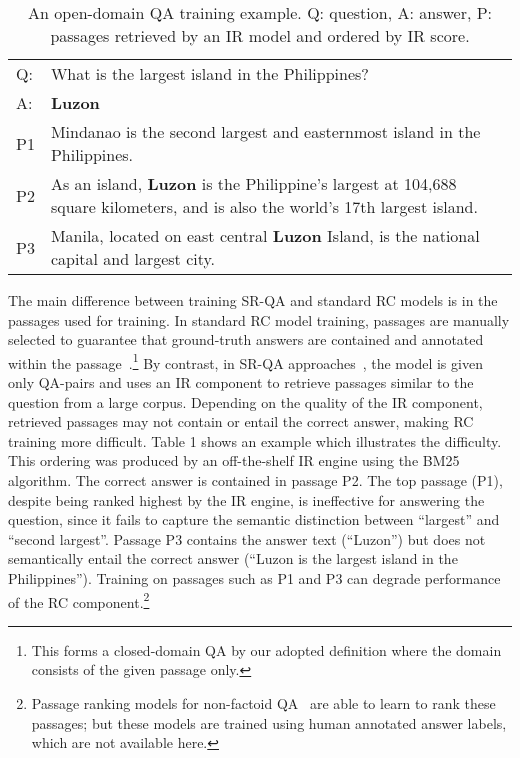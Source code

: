 \documentclass[letterpaper]{article} %
\begin{document}
\begin{table}[]
\centering
\small
\begin{tabular}{ll}
Q: & \multicolumn{1}{p{7cm}}{What is the largest island in the Philippines?}                                                      \\
A: & \multicolumn{1}{p{7cm}}{\textbf{Luzon}}\\
P1 & \multicolumn{1}{p{7cm}}{Mindanao is the second largest and easternmost island in the Philippines.}                               \\
P2 & \multicolumn{1}{p{7cm}}{As an island, \textbf{Luzon} is the Philippine's largest at 104,688 square kilometers, and is also the world's 17th largest island.}                                       \\
P3 & \multicolumn{1}{p{7cm}}{Manila, located on east central \textbf{Luzon} Island, is the national capital and largest city. }                                       \\
\end{tabular}
\normalsize
\caption{An open-domain QA training example. Q: question, A: answer, P: passages retrieved by an IR model and ordered by IR score. }
\label{example}
\end{table}
The main difference between training SR-QA and standard RC models is in the passages used for training. In standard RC model training, passages are manually selected to guarantee that ground-truth answers are contained and annotated within the passage~\cite{rajpurkar2016squad}.\footnote{This forms a closed-domain QA by our adopted definition where the domain consists of the given passage only.}
By contrast, in SR-QA approaches~\cite{chen2017reading,dhingra2017quasar}, the model is given only QA-pairs and uses an IR component to retrieve passages similar to the question from a large corpus. 
Depending on the quality of the IR component, retrieved passages may not contain or entail the correct answer, making RC training more difficult.
Table 1 shows an example which illustrates the difficulty. This ordering was produced by an off-the-shelf IR engine using the BM25 algorithm. The correct answer is contained in passage P2. The top passage (P1), despite being ranked highest by the IR engine, is ineffective for answering the question, since it fails to capture the semantic distinction between ``largest'' and ``second largest''. Passage P3 contains the answer text (``Luzon'') but does not semantically entail the correct answer (``Luzon is the largest island in the Philippines''). Training on passages such as P1 and P3 can degrade performance of the RC component.\footnote{Passage ranking models for non-factoid QA~\cite{wang2007jeopardy,yang2015wikiqa} are able to learn to rank these passages; but these models are trained using human annotated answer labels, which are not available here.}  
\end{document}
